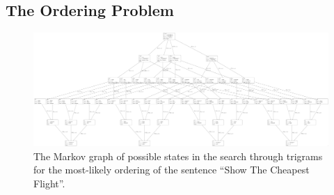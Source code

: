 \documentclass[11pt]{article}
\numberwithin{equation}{section}
\numberwithin{figure}{section}
\theoremstyle{plain}
\theoremstyle{definition}
\DeclareMathOperator*{\argmin}{argmin}
\begin{document}

\subsection{The Ordering Problem} \label{ordering}
\begin{figure}
	\centering 
	\includegraphics[scale=0.15]{markov_reordering2}
	\caption{The Markov graph of possible states in the search through trigrams for the most-likely ordering of the sentence 
		``Show The Cheapest Flight''.}
	\label{markov_diagram}
\end{figure}
\end{document}
